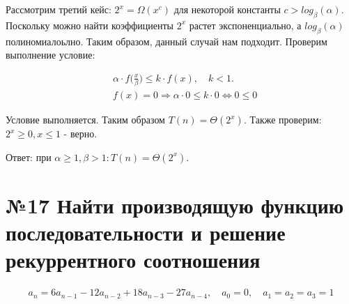 \documentclass[a4paper,12pt,numbers=noenddot]{scrreprt}
\begin{document}
\begin{flushleft}
    Рассмотрим третий кейс: $2^x=\Omega(x^c)$ для некоторой константы $c>log_\beta(\alpha)$. Поскольку можно найти коэффициенты $2^x$ растет экспоненциально, а $log_\beta(\alpha)$ полиномиалоьлно. Таким образом, данный случай нам подходит. Проверим выполнение условие:
\end{flushleft}

\begin{align}
    & \alpha \cdot f \big(\frac{x}{\beta} \big) \leq k \cdot f(x), \quad k < 1. \\&
    f(x)=0 \Rightarrow \alpha \cdot 0 \leq k \cdot 0 \Leftrightarrow 0 \leq 0
\end{align}

\begin{flushleft}
    Условие выполняется. Таким образом $T(n)=\Theta(2^x)$. Также проверим: $2^x \geq 0, x \leq 1$ - верно.
\end{flushleft}

\begin{flushleft}
Ответ: при $\alpha \geq 1, \beta > 1: T(n)=\Theta(2^x)$.
\end{flushleft}

\section{№17 Найти производящую функцию последовательности и решение рекуррентного соотношения}

\begin{align}
    a_n=6a_{n-1}-12a_{n-2}+18a_{n-3}-27a_{n-4}, \quad a_0=0, \quad a_1=a_2=a_3 = 1
\end{align}
\end{document}

